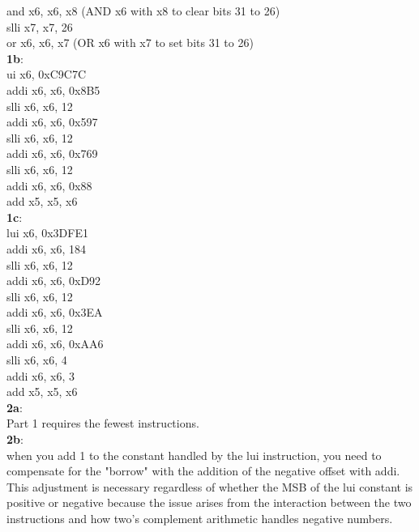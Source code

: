 \documentclass[11pt]{article}
\begin{document}
	and x6, x6, x8 (AND x6 with x8 to clear bits 31 to 26)\\
	slli x7, x7, 26\\
	or x6, x6, x7 (OR x6 with x7 to set bits 31 to 26)\\
	\textbf{1b}:\\
    ui x6, 0xC9C7C          \\
    addi x6, x6, 0x8B5          \\
    slli x6, x6, 12             \\
    addi x6, x6, 0x597         \\
    slli x6, x6, 12             \\
    addi x6, x6, 0x769         \\
    slli x6, x6, 12             \\
    addi x6, x6, 0x88           \\
    add x5, x5, x6           \\
    
	\textbf{1c}:\\
	 lui x6, 0x3DFE1              \\
	addi x6, x6, 184              \\
	slli x6, x6, 12               \\
	addi x6, x6, 0xD92          \\
	slli x6, x6, 12               \\
	addi x6, x6, 0x3EA            \\
	slli x6, x6, 12               \\
	addi x6, x6, 0xAA6           \\
	slli x6, x6, 4              \\
	addi x6, x6, 3                \\
	add x5, x5, x6                \\
	\textbf{2a}:\\
	Part 1 requires the fewest instructions.\\
	\textbf{2b}:\\
	when you add 1 to the constant handled by the lui instruction, you need to compensate for the "borrow" with  the addition of the negative offset with addi. This adjustment is necessary regardless of whether the MSB of the lui constant is positive or negative because the issue arises from the interaction between the two instructions and how two's complement arithmetic handles negative numbers.\\
	
	

	

	
	
	
\end{document}
